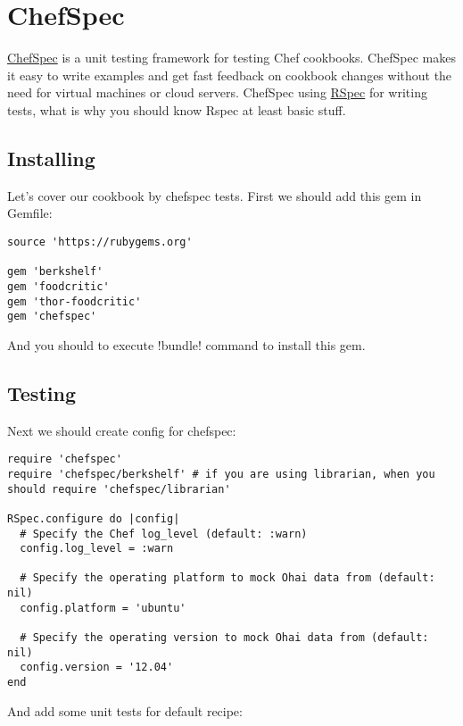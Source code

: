 \section{ChefSpec}
\label{sec:testing-chefspec}

\href{http://code.sethvargo.com/chefspec/}{ChefSpec} is a unit testing framework for testing Chef cookbooks. ChefSpec makes it easy to write examples and get fast feedback on cookbook changes without the need for virtual machines or cloud servers. ChefSpec using \href{http://rspec.info/}{RSpec} for writing tests, what is why you should know Rspec at least basic stuff.

\subsection{Installing}

Let's cover our cookbook by chefspec tests. First we should add this gem in Gemfile:

\begin{lstlisting}[label=lst:testing-chefspec1]
source 'https://rubygems.org'

gem 'berkshelf'
gem 'foodcritic'
gem 'thor-foodcritic'
gem 'chefspec'
\end{lstlisting}

And you should to execute \inline!bundle! command to install this gem.

\subsection{Testing}

Next we should create config for chefspec:

\begin{lstlisting}[label=lst:testing-chefspec2,title=my-server-cloud/site-cookbooks/my\_cool\_app/spec/spec\_helper.rb]
require 'chefspec'
require 'chefspec/berkshelf' # if you are using librarian, when you should require 'chefspec/librarian'

RSpec.configure do |config|
  # Specify the Chef log_level (default: :warn)
  config.log_level = :warn

  # Specify the operating platform to mock Ohai data from (default: nil)
  config.platform = 'ubuntu'

  # Specify the operating version to mock Ohai data from (default: nil)
  config.version = '12.04'
end
\end{lstlisting}

And add some unit tests for default recipe:

